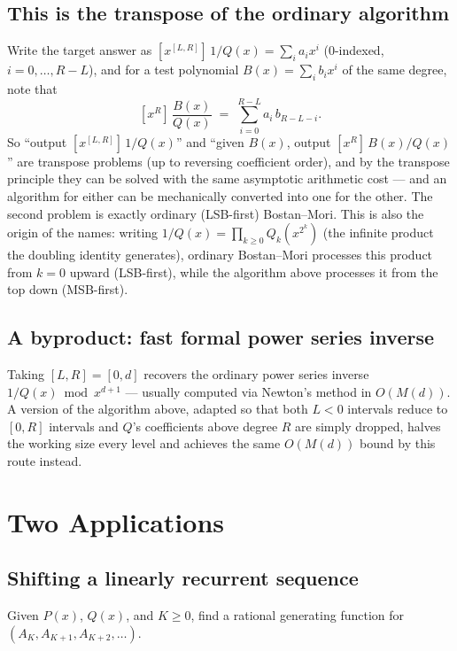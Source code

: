 \documentclass[11pt]{article}
\begin{document}
\subsection{This is the transpose of the ordinary algorithm}
\begin{notebox}
Write the target answer as $[x^{[L,R]}]\,1/Q(x) = \sum_i a_i x^i$
(0-indexed, $i=0,\ldots,R-L$), and for a test polynomial $B(x)=\sum_i
b_i x^i$ of the same degree, note that
\[
  [x^R]\,\frac{B(x)}{Q(x)} \;=\; \sum_{i=0}^{R-L} a_i\, b_{R-L-i}.
\]
So ``output $[x^{[L,R]}]\,1/Q(x)$'' and ``given $B(x)$, output
$[x^R]\,B(x)/Q(x)$'' are transpose problems (up to reversing coefficient
order), and by the transpose principle they can be solved with the same
asymptotic arithmetic cost --- and an algorithm for either can be
mechanically converted into one for the other. The second problem is
exactly ordinary (LSB-first) Bostan--Mori. This is also the origin of the
names: writing $1/Q(x) = \prod_{k\ge 0} Q_k(x^{2^k})$ (the infinite
product the doubling identity generates), ordinary Bostan--Mori processes
this product from $k=0$ upward (LSB-first), while the algorithm above
processes it from the top down (MSB-first).
\end{notebox}

\subsection{A byproduct: fast formal power series inverse}
Taking $[L,R]=[0,d]$ recovers the ordinary power series inverse
$1/Q(x) \bmod x^{d+1}$ --- usually computed via Newton's method in
$O(M(d))$. A version of the algorithm above, adapted so that both $L<0$
intervals reduce to $[0,R]$ intervals and $Q$'s coefficients above degree
$R$ are simply dropped, halves the working size every level and achieves
the same $O(M(d))$ bound by this route instead.

\section{Two Applications}

\subsection{Shifting a linearly recurrent sequence}
\begin{definitionbox}
Given $P(x)$, $Q(x)$, and $K\ge 0$, find a rational generating function
for $(A_K, A_{K+1}, A_{K+2}, \ldots)$.
\end{definitionbox}
\end{document}
